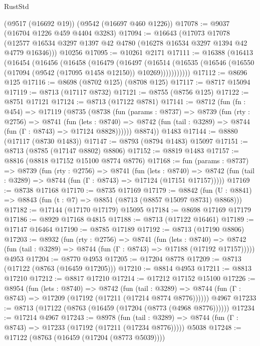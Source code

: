 \begin{lexlean}{RustStd}
\begin{coremodule}
    (@9517 (@16692 @19))
    (@9542 (@16697 @460 @1226))
@17078 := @9037 (@16704 @1226 @459 @4404 @3283)
@17094 := @16643
    (@17073
      @17078
      (@12577 @16534 @3297 @1397 @42 @4780 (@16278 @16534 @3297 @1394 @42 @4779 @16346)))
    @10256
@17095 := @10261 @2171
@17111 := @16388
    (@16413
      (@16454
        (@16456
          (@16458
            (@16479
              (@16497
                (@16514
                  (@16535 (@16546 (@16550 (@17094 (@9542 (@17095 @1458 @12150)) @10269)))))))))))
@17112 := @8696 @125
@17116 := @8698 (@8702 @125) (@8708 @125)
@17117 := @8717 @15094
@17119 := @8713 (@17117 @8732)
@17121 := @8755 (@8756 @125)
@17122 := @8751 @17121
@17124 := @8713 (@17122 @8781)
@17141 := @8712
    (fun (fn : @454) =>
    @17119
      (@8735
        (@8738
          (fun (params : @8737) =>
          @8739
            (fun (rty : @2756) =>
            @8741
              (fun (lets : @8740) =>
              @8742 (fun (tail : @3289) => @8744 (fun (Γ : @8743) => @17124 @8828))))))
        @8874))
    @1483
@17144 := @8880 (@17117 (@8730 @1483))
@17147 := @8793 (@8794 @1483) @15097
@17151 := @8713 (@8785 (@17147 @8802) @8806)
@17152 := @8819 @1483
@17157 := @8816 (@8818 @17152 @15100 @8774 @8776)
@17168 := fun (params : @8737) =>
  @8739
    (fun (rty : @2756) =>
    @8741
      (fun (lets : @8740) =>
      @8742 (fun (tail : @3289) => @8744 (fun (Γ : @8743) => @17124 (@17151 @17157)))))
@17169 := @8738 @17168
@17170 := @8735 @17169
@17179 := @8842
    (fun (U : @8841) => @8843 (fun (t : @7) => @8851 (@8713 (@8857 @15097 @8731) @8868)))
@17182 := @17144 (@17170 @17179) @15095
@17184 := @8698 @17169 @17179
@17186 := @8929 @17168 @4815
@17188 := @8713 (@17122 @16461)
@17189 := @17147 @16464
@17190 := @8785 @17189
@17192 := @8713 (@17190 @8806)
@17203 := @8932
    (fun (rty : @2756) =>
    @8741
      (fun (lets : @8740) =>
      @8742 (fun (tail : @3289) => @8744 (fun (Γ : @8743) => @17188 (@17192 @17157)))))
    @4953
@17204 := @8770 @4953
@17205 := @17204 @8778
@17209 := @8713 (@17122 (@8763 (@16459 @17205)))
@17210 := @8814 @4953
@17211 := @8813 @17210
@17212 := @8817 @17210
@17214 := @17212 @17152 @15100
@17226 := @8954
    (fun (lets : @8740) =>
    @8742
      (fun (tail : @3289) =>
      @8744 (fun (Γ : @8743) => @17209 (@17192 (@17211 (@17214 @8774 @8776))))))
    @4967
@17233 := @8713 (@17122 (@8763 (@16459 (@17204 (@8773 (@4968 @8776))))))
@17234 := @17214 @4967
@17243 := @8978
    (fun (tail : @3289) => @8744 (fun (Γ : @8743) => @17233 (@17192 (@17211 (@17234 @8776)))))
    @5038
@17248 := @17122 (@8763 (@16459 (@17204 (@8773 @5039))))

\end{coremodule}
\end{lexlean}
